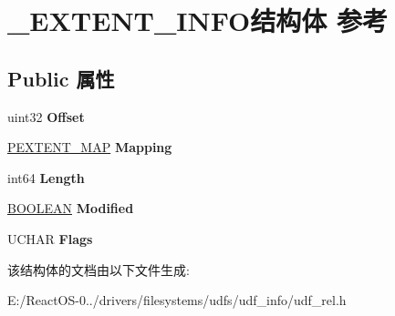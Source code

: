\hypertarget{struct___e_x_t_e_n_t___i_n_f_o}{}\section{\+\_\+\+E\+X\+T\+E\+N\+T\+\_\+\+I\+N\+F\+O结构体 参考}
\label{struct___e_x_t_e_n_t___i_n_f_o}
\subsection*{Public 属性}
\begin{DoxyCompactItemize}
\item 
\mbox{\label{struct___e_x_t_e_n_t___i_n_f_o_ac31c69801c698e34288117d9466c36de}} 
uint32 {\bfseries Offset}
\item 
\mbox{\label{struct___e_x_t_e_n_t___i_n_f_o_a03e2ef37956e6542935825d6d9c46c7e}} 
\hyperlink{struct___e_x_t_e_n_t___a_d}{P\+E\+X\+T\+E\+N\+T\+\_\+\+M\+AP} {\bfseries Mapping}
\item 
\mbox{\label{struct___e_x_t_e_n_t___i_n_f_o_a709ab7db3bf5c0d3e3ad09cdab88fbed}} 
int64 {\bfseries Length}
\item 
\mbox{\label{struct___e_x_t_e_n_t___i_n_f_o_ab01f0e05b4b10ad56f9d99ce6d1d3ec4}} 
\hyperlink{_processor_bind_8h_a112e3146cb38b6ee95e64d85842e380a}{B\+O\+O\+L\+E\+AN} {\bfseries Modified}
\item 
\mbox{\label{struct___e_x_t_e_n_t___i_n_f_o_a769563fc2d01ad26de9fc615c0caa6bb}} 
U\+C\+H\+AR {\bfseries Flags}
\end{DoxyCompactItemize}


该结构体的文档由以下文件生成\+:\begin{DoxyCompactItemize}
\item 
E\+:/\+React\+O\+S-\/0../drivers/filesystems/udfs/udf\+\_\+info/udf\+\_\+rel.\+h\end{DoxyCompactItemize}
